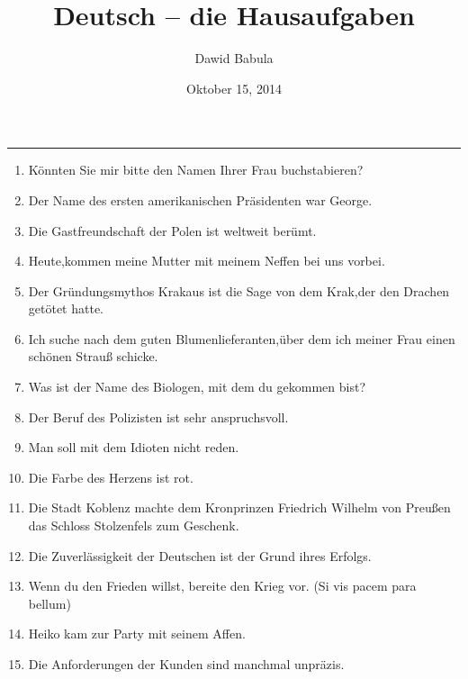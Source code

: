\documentclass[a4paper,12pt]{article}
\author{Dawid Babula}
\title{Deutsch -- die Hausaufgaben}
\date{Oktober 15, 2014}
\makeatletter
\def\thickhrulefill{\leavevmode \leaders \hrule height 1pt\hfill \kern \z@}
\def\maketitle{%
    \null
    \thispagestyle{empty}%
    \vfill
    \begin{center}\leavevmode
    \normalfont
    {\LARGE\raggedleft \@author\par}%
    \thickhrulefill\par
    {\huge\raggedright \@title\par}%
    \vskip 1cm
    \end{center}%
    \vfill
    {\Large \@date\par}%
    \null
    \cleardoublepage
    }
\makeatother
\begin{document}
\maketitle

\begin{enumerate}
    \item K\"onnten Sie mir bitte den Namen Ihrer Frau buchstabieren?
    \item Der Name des ersten amerikanischen Pr\"asidenten war George.
    \item Die Gastfreundschaft der Polen ist weltweit ber\"umt.
    \item Heute,kommen meine Mutter mit meinem Neffen bei uns vorbei.
    \item Der Gr\"undungsmythos Krakaus ist die Sage von dem Krak,der den Drachen get\"otet hatte.
    \item Ich suche nach dem guten Blumenlieferanten,\"uber dem ich meiner Frau einen sch\"onen Strau{\ss} schicke.
    \item Was ist der Name des Biologen, mit dem du gekommen bist?
    \item Der Beruf des Polizisten ist sehr anspruchsvoll.
    \item Man soll mit dem Idioten nicht reden.
    \item Die Farbe des Herzens ist rot.
    \item Die Stadt Koblenz machte dem Kronprinzen Friedrich Wilhelm von Preu{\ss}en das Schloss Stolzenfels zum Geschenk.
    \item Die Zuverl\"assigkeit der Deutschen ist der Grund ihres Erfolgs.
    \item Wenn du den Frieden willst, bereite den Krieg vor. (Si vis pacem para bellum)
    \item Heiko kam zur Party mit seinem Affen.
    \item Die Anforderungen der Kunden sind manchmal unpr\"azis.
\end{enumerate}
\end{document}

